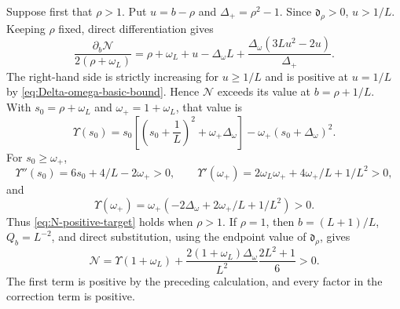 \documentclass[11pt,a4paper]{article}
\numberwithin{equation}{section}
\begin{document}
Suppose first that \(\rho>1\).  Put \(u=b-\rho\) and
\(\Delta_+=\rho^2-1\).  Since \(\mathfrak d_\rho>0\), \(u>1/L\).
Keeping \(\rho\) fixed,
direct differentiation gives
\[
 \frac{\partial_b\mathcal N}{2(\rho+\omega_L)}
 =\rho+\omega_L+u-\Delta_\omega L
 +\frac{\Delta_\omega(3Lu^2-2u)}{\Delta_+}.
\]
The right-hand side is strictly increasing for \(u\geq1/L\) and is positive
at \(u=1/L\) by \eqref{eq:Delta-omega-basic-bound}.  Hence \(\mathcal N\) exceeds
its value at
\(b=\rho+1/L\).  With
\(s_0=\rho+\omega_L\) and \(\omega_+=1+\omega_L\), that value is
\[
 \Upsilon(s_0)
 =s_0\left[\left(s_0+\frac1L\right)^2+\omega_+\Delta_\omega\right]
 -\omega_+(s_0+\Delta_\omega)^2.
\]
For \(s_0\geq\omega_+\),
\[
 \Upsilon''(s_0)=6s_0+4/L-2\omega_+>0,\qquad
 \Upsilon'(\omega_+)=2\omega_L\omega_++4\omega_+/L+1/L^2>0,
\]
and
\[
 \Upsilon(\omega_+)
 =\omega_+(-2\Delta_\omega+2\omega_+/L+1/L^2)>0.
\]
Thus \eqref{eq:N-positive-target} holds when \(\rho>1\).  If \(\rho=1\),
then \(b=(L+1)/L\), \(Q_b=L^{-2}\), and direct substitution, using the
endpoint value of \(\mathfrak d_\rho\), gives
\[
 \mathcal N=\Upsilon(1+\omega_L)
 +\frac{2(1+\omega_L)\Delta_\omega}{L^2}
   \frac{2L^2+1}{6}>0.
\]
The first term is positive by the preceding calculation, and every factor
in the correction term is positive.
\end{document}
